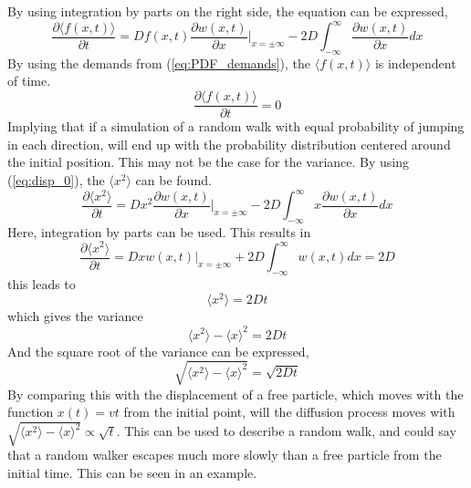 \documentclass[%
twoside,                 %
final,                   %
chapterprefix=true,      %
open=right               %
10pt]{book}
\newcommand{\clearemptydoublepage}{\clearpage{\pagestyle{empty}\cleardoublepage}}
\begin{document}
By using integration by parts on the right side, the equation can be expressed,
\begin{equation} \label{eq:disp_0}
\frac{\partial \langle f(x,t) \rangle}{\partial t} = D f(x,t) \frac{\partial w(x,t)}{\partial x}|_{x=\pm \infty} - 2D \int^{\infty}_{-\infty} \frac{\partial w(x,t)}{\partial x}dx
\end{equation}
By using the demands from (\ref{eq:PDF_demands}), the $\langle f(x,t) \rangle$ is independent of time. 
\begin{equation}
\frac{\partial \langle f(x,t) \rangle}{\partial t} = 0
\end{equation}
Implying that if a simulation of a random walk with equal probability of jumping in each direction, will end up with the probability distribution centered around the initial position. This may not be the case for the variance. By using (\ref{eq:disp_0}), the $\langle x^2 \rangle $ can be found. 
\begin{equation} 
\frac{\partial \langle x^2 \rangle}{\partial t} = D x^2 \frac{\partial w(x,t)}{\partial x}|_{x=\pm \infty} - 2D \int^{\infty}_{-\infty} x\frac{\partial w(x,t)}{\partial x}dx
\end{equation}
Here, integration by parts can be used. This results in
\begin{equation}
\frac{\partial \langle x^2 \rangle}{\partial t} = D x w(x,t)|_{x=\pm \infty} + 2D \int^{\infty}_{-\infty} w(x,t)dx = 2D
\end{equation}
this leads to
\begin{equation}
\langle x^2 \rangle = 2Dt
\end{equation}
which gives the variance
\begin{equation} \label{eq:diff_var}
\langle x^2 \rangle -\langle x \rangle^2 = 2Dt
\end{equation}
And the square root of the variance can be expressed,
\begin{equation}
\sqrt{\langle x^2 \rangle -\langle x \rangle^2} = \sqrt{2Dt}
\end{equation}
By comparing this with the displacement of a free particle, which moves with the function $x(t)=vt$ from the initial point, will the diffusion process moves with $\sqrt{\langle x^2 \rangle -\langle x \rangle^2} \propto \sqrt{t}$. This can be used to describe a random walk, and could say that a random walker escapes much more slowly than a free particle from the initial time. This can be seen in an example. 



\clearemptydoublepage
{}
\thispagestyle{empty}







\clearemptydoublepage
{}
\thispagestyle{empty}
\printindex
\end{document}

